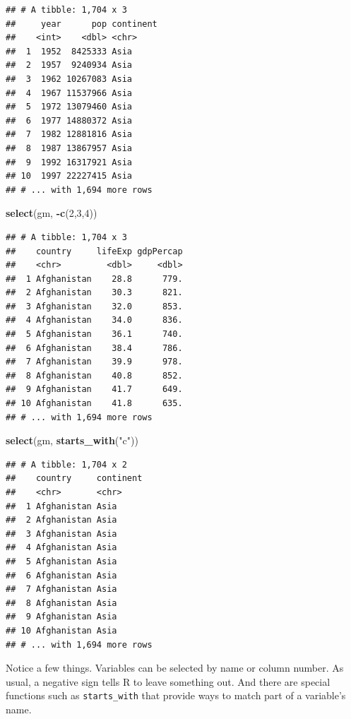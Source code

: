\documentclass[
]{krantz}
\newenvironment{Shaded}{\begin{snugshade}}{\end{snugshade}}
\newcommand{\DecValTok}[1]{\textcolor[rgb]{0.00,0.00,0.81}{#1}}
\newcommand{\KeywordTok}[1]{\textcolor[rgb]{0.13,0.29,0.53}{\textbf{#1}}}
\newcommand{\NormalTok}[1]{#1}
\newcommand{\OperatorTok}[1]{\textcolor[rgb]{0.81,0.36,0.00}{\textbf{#1}}}
\newcommand{\StringTok}[1]{\textcolor[rgb]{0.31,0.60,0.02}{#1}}
\begin{document}
\begin{verbatim}
## # A tibble: 1,704 x 3
##     year      pop continent
##    <int>    <dbl> <chr>    
##  1  1952  8425333 Asia     
##  2  1957  9240934 Asia     
##  3  1962 10267083 Asia     
##  4  1967 11537966 Asia     
##  5  1972 13079460 Asia     
##  6  1977 14880372 Asia     
##  7  1982 12881816 Asia     
##  8  1987 13867957 Asia     
##  9  1992 16317921 Asia     
## 10  1997 22227415 Asia     
## # ... with 1,694 more rows
\end{verbatim}

\begin{Shaded}
\begin{Highlighting}[]
\KeywordTok{select}\NormalTok{(gm, }\OperatorTok{{-}}\KeywordTok{c}\NormalTok{(}\DecValTok{2}\NormalTok{,}\DecValTok{3}\NormalTok{,}\DecValTok{4}\NormalTok{))}
\end{Highlighting}
\end{Shaded}

\begin{verbatim}
## # A tibble: 1,704 x 3
##    country     lifeExp gdpPercap
##    <chr>         <dbl>     <dbl>
##  1 Afghanistan    28.8      779.
##  2 Afghanistan    30.3      821.
##  3 Afghanistan    32.0      853.
##  4 Afghanistan    34.0      836.
##  5 Afghanistan    36.1      740.
##  6 Afghanistan    38.4      786.
##  7 Afghanistan    39.9      978.
##  8 Afghanistan    40.8      852.
##  9 Afghanistan    41.7      649.
## 10 Afghanistan    41.8      635.
## # ... with 1,694 more rows
\end{verbatim}

\begin{Shaded}
\begin{Highlighting}[]
\KeywordTok{select}\NormalTok{(gm, }\KeywordTok{starts\_with}\NormalTok{(}\StringTok{"c"}\NormalTok{))}
\end{Highlighting}
\end{Shaded}

\begin{verbatim}
## # A tibble: 1,704 x 2
##    country     continent
##    <chr>       <chr>    
##  1 Afghanistan Asia     
##  2 Afghanistan Asia     
##  3 Afghanistan Asia     
##  4 Afghanistan Asia     
##  5 Afghanistan Asia     
##  6 Afghanistan Asia     
##  7 Afghanistan Asia     
##  8 Afghanistan Asia     
##  9 Afghanistan Asia     
## 10 Afghanistan Asia     
## # ... with 1,694 more rows
\end{verbatim}

Notice a few things. Variables can be selected by name or column number. As usual, a negative sign tells R to leave something out. And there are special functions such as \texttt{starts\_with} that provide ways to match part of a variable's name.
\end{document}
